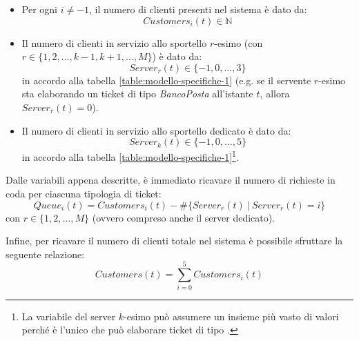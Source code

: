 \begin{itemize}
\item Per ogni $i \neq -1$, il numero di clienti presenti nel sistema è dato da:
\begin{equation}
Customers_i(t) \in \mathbb{N}
\end{equation}
\item Il numero di clienti in servizio allo sportello $r$-esimo (con $r \in \lbrace 1, 2, \dots, k-1, k+1, \dots, M \rbrace$) è dato da:
\begin{equation}
Server_r(t) \in \lbrace -1, 0, \dots, 3 \rbrace
\end{equation}
in accordo alla tabella \ref{table:modello-specifiche-1} (e.g. se il servente $r$-esimo sta elaborando un ticket di tipo \uo{} \textsl{BancoPosta} all'istante $t$, allora $Server_r(t)=0$).
\item Il numero di clienti in servizio allo sportello dedicato è dato da:
\begin{equation}
Server_k(t) \in \lbrace -1, 0, \dots, 5 \rbrace
\end{equation}
in accordo alla tabella \ref{table:modello-specifiche-1}\footnote{La variabile del server $k$-esimo può assumere un insieme più vasto di valori perché è l'unico che può elaborare ticket di tipo \sr{}.}.
\end{itemize}

Dalle variabili appena descritte, è immediato ricavare il numero di richieste in coda per ciascuna tipologia di ticket:
\begin{equation}
Queue_i(t) = Customers_i(t) - \# \lbrace Server_r(t)\ \vert\ Server_r(t) = i \rbrace
\end{equation}
con $r \in \lbrace 1, 2, \dots, M \rbrace$ (ovvero compreso anche il server dedicato).

Infine, per ricavare il numero di clienti totale nel sistema è possibile sfruttare la seguente relazione:
\begin{equation}
Customers(t) = \sum_{i=0}^{5} Customers_i(t)
\end{equation}

